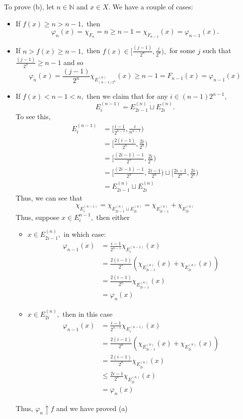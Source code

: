 \documentclass[11pt]{article}
\newcommand{\bbN}{\mathbb{N}}
\begin{document}
\begin{solution}
    To prove (b), let $n \in \bbN$ and $x\in X.$ We have a couple of cases:
    \begin{itemize}
        \item If $f(x) \geq n >n-1,$ then 
        \[\varphi_n(x) = \chi_{F_n} = n \geq n-1 =\chi_{F_{n-1}}(x)= \varphi_{n-1}(x).\]
        \item If $n > f(x) \geq n-1,$ then $f(x) \in [\frac{(j-1)}{2^n}, \frac{j}{2^n}),$ for some $j$ such that $\frac{(j-1)}{2^n} \geq n-1$ and so
        \[\varphi_n(x) = \frac{(j-1)}{2^n}\chi_{E_{(n-1)2^n}^{(n)}}(x) \geq n-1= F_{n-1}(x) = \varphi_{n-1}(x)\]
        \item If $f(x) < n-1 < n,$ then we claim that for any $i \in (n-1)2^{n-1},$
        \[E_{i}^{(n-1)}= E_{2i -1}^{(n)}\sqcup E_{2i}^{(n)}.\] To see this, 
        \begin{align*}
        E_{i}^{(n-1)} &=[\frac{i-1}{2^{n-1}}, \frac{i}{n^{n-1}})\\ &= [\frac{2(i -1)}{2^{n}}, \frac{2i}{2^n})\\ &=  [\frac{(2i -1) -1}{2^{n}}, \frac{2i}{2^n})\\ &= [\frac{(2i-1) -1}{2^{n}}, \frac{2i-1}{2^{n}}) \sqcup [\frac{2i-1}{2^{n}}, \frac{2i}{2^n})\\ &= E_{2i -1}^{(n)}\sqcup E_{2i}^{(n)}    
        \end{align*}
        Thus, we can see that
        \[\chi_{E_{i}^{(n-1)}}  = \chi_{E_{2i -1}^{(n)}\sqcup E_{2i}^{(n)}} = \chi_{E_{2i -1}^{(n)}} + \chi_{ E_{2i}^{(n)}}\]
        Thus, suppose $x\in E_i^{n-1},$ then either 
        \begin{itemize}
            \item $x\in E_{2i -1}^{(n)},$ in which case:
            \begin{align*}
                \varphi_{n-1}(x) &= \frac{i-1}{2^{n-1}}\chi_{E_{i}^{(n-1)}}(x)\\
                &= \frac{2(i-1)}{2^{n}}(\chi_{E_{2i -1}^{(n)}}(x) + \chi_{ E_{2i}^{(n)}}(x))\\
                &= \frac{2(i-1)}{2^{n}}\chi_{E_{2i -1}^{(n)}}(x)\\
                &= \varphi_n(x)
            \end{align*}
            \item $x\in E_{2i}^{(n)},$ then in this case
            \begin{align*}
                \varphi_{n-1}(x) &= \frac{i-1}{2^{n-1}}\chi_{E_{i}^{(n-1)}}(x)\\
                &= \frac{2(i-1)}{2^{n}}(\chi_{E_{2i -1}^{(n)}}(x) + \chi_{ E_{2i}^{(n)}}(x))\\
                &= \frac{2(i-1)}{2^{n}}\chi_{E_{2i}^{(n)}}(x)\\
                &\leq 
                \frac{2i-1}{2^{n}}\chi_{E_{2i}^{(n)}}(x)\\
                &= \varphi_n(x)
            \end{align*}
        \end{itemize}
Thus, $\varphi_n \uparrow f$ and we have proved (a)


\end{itemize}
\end{solution}
\end{document}
